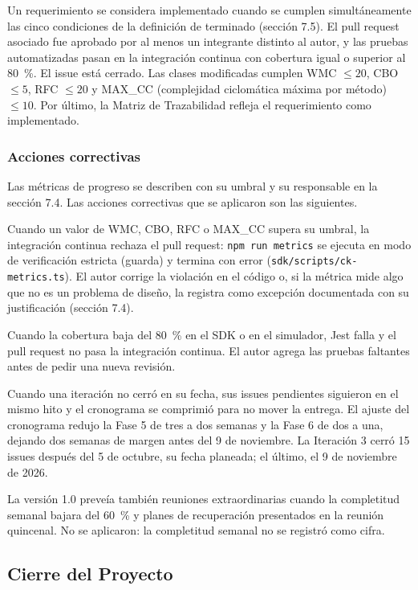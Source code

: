 Un requerimiento se considera implementado cuando se cumplen simultáneamente las cinco condiciones de la definición de terminado (sección 7.5). El pull request asociado fue aprobado por al menos un integrante distinto al autor, y las pruebas automatizadas pasan en la integración continua con cobertura igual o superior al 80~\%. El issue está cerrado. Las clases modificadas cumplen WMC $\le 20$, CBO $\le 5$, RFC $\le 20$ y MAX\_CC (complejidad ciclomática máxima por método) $\le 10$. Por último, la Matriz de Trazabilidad refleja el requerimiento como implementado.

\subsubsection{Acciones correctivas}

Las métricas de progreso se describen con su umbral y su responsable en la sección 7.4. Las acciones correctivas que se aplicaron son las siguientes.

Cuando un valor de WMC, CBO, RFC o MAX\_CC supera su umbral, la integración continua rechaza el pull request: \texttt{npm run metrics} se ejecuta en modo de verificación estricta (guarda) y termina con error (\texttt{sdk/scripts/ck-metrics.ts}). El autor corrige la violación en el código o, si la métrica mide algo que no es un problema de diseño, la registra como excepción documentada con su justificación (sección 7.4).

Cuando la cobertura baja del 80~\% en el SDK o en el simulador, Jest falla y el pull request no pasa la integración continua. El autor agrega las pruebas faltantes antes de pedir una nueva revisión.

Cuando una iteración no cerró en su fecha, sus issues pendientes siguieron en el mismo hito y el cronograma se comprimió para no mover la entrega. El ajuste del cronograma redujo la Fase 5 de tres a dos semanas y la Fase 6 de dos a una, dejando dos semanas de margen antes del 9 de noviembre. La Iteración 3 cerró 15 issues después del 5 de octubre, su fecha planeada; el último, el 9 de noviembre de 2026.

La versión 1.0 preveía también reuniones extraordinarias cuando la completitud semanal bajara del 60~\% y planes de recuperación presentados en la reunión quincenal. No se aplicaron: la completitud semanal no se registró como cifra.

\subsection{Cierre del Proyecto}

